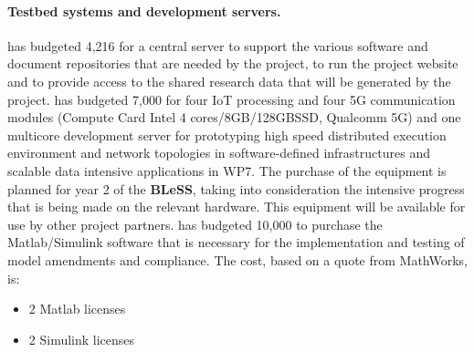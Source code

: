\documentclass[a4paper,11pt]{article}
\newcommand{\project}[1]{\textbf{#1}\xspace}
\newcommand{\BLESS}{\project{BLeSS}}
\newcommand{\TheProject}{\BLESS}
\begin{document}
\paragraph{Testbed systems and development servers.}
\SAshort{} has budgeted \euros{} 4,216 for a central
server to support the various software and document repositories that are needed by the project, to run the project website and to provide access
to the shared research data that will be generated by the project.
%
%
%
\GOLEMshort{} has budgeted \euros{} 7,000 for four IoT processing and
four 5G communication modules (Compute Card Intel 4 cores/8GB/128GBSSD,
Qualcomm 5G) and one multicore development server for prototyping high
speed distributed execution environment and network topologies in
software-defined infrastructures and scalable data intensive applications
in WP7. The purchase of the equipment is planned for year 2 of the
\TheProject{}, taking into consideration the intensive progress that is
being made on the relevant hardware.  This equipment will be available for use by other project partners.
%
\PRshort{} has budgeted \euros{} 10,000 to purchase the Matlab/Simulink software that is necessary for the implementation and testing of model amendments and
compliance. The cost, based on a quote from MathWorks, is:
\begin{itemize}
\item 2 Matlab licenses  
\item 2 Simulink licenses 
\end{itemize} 
\end{document}
